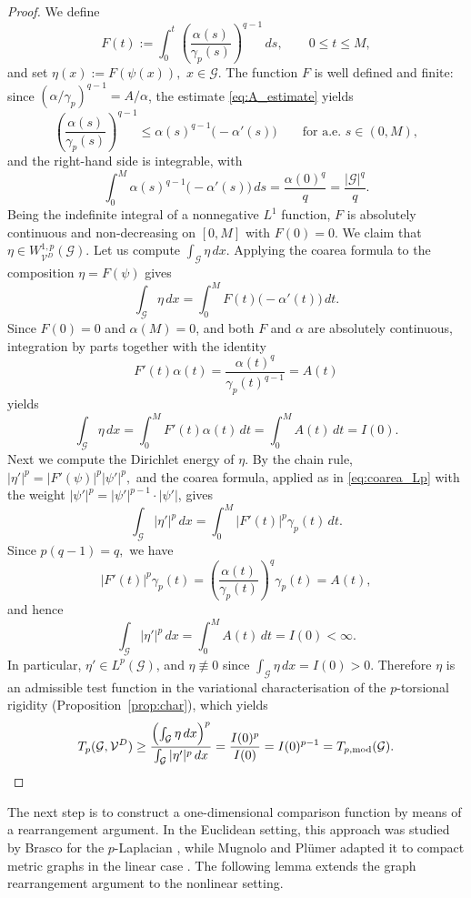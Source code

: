 \documentclass[12pt,a4paper]{article}
\numberwithin{equation}{section}
\newcommand{\WpD}{W^{1,p}_{\mathcal{V}^D}(\mathcal G)}
\begin{document}
\begin{proof}
		
		We define
		\[
		F(t)
		:=
		\int_0^t
		\left(
		\frac{\alpha(s)}{\gamma_p(s)}
		\right)^{q-1}
		\,ds,
		\qquad
		0\le t\le M,
		\]
		and set
		\(
		\eta(x):=F(\psi(x)),
		\) \(x\in\mathcal G.
		\)
		The function $F$ is well defined and finite: since
		$(\alpha/\gamma_p)^{q-1}=A/\alpha$, the estimate \eqref{eq:A_estimate}
		yields
		\[
		\left(\frac{\alpha(s)}{\gamma_p(s)}\right)^{q-1}
		\le
		\alpha(s)^{q-1}\bigl(-\alpha'(s)\bigr)
		\qquad\text{for a.e. }s\in(0,M),
		\]
		and the right-hand side is integrable, with
		\[
		\int_0^M\alpha(s)^{q-1}\bigl(-\alpha'(s)\bigr)\,ds
		=\frac{\alpha(0)^q}{q}
		=\frac{|\mathcal G|^q}{q}.
		\]
		Being the indefinite
		integral of a nonnegative $L^1$ function, $F$ is absolutely continuous
		and non-decreasing on $[0,M]$ with $F(0)=0$.
		We claim that $\eta\in\WpD$.
		Let us compute $\int_{\mathcal G}\eta\,dx$. Applying the coarea
		formula to the composition $\eta=F(\psi)$ gives
		\[
		\int_{\mathcal G}\eta\,dx
		=
		\int_0^M
		F(t)\bigl(-\alpha'(t)\bigr)\,dt.
		\]
		Since $F(0)=0$ and $\alpha(M)=0$, and both $F$ and $\alpha$ are
		absolutely continuous, integration by parts together with the identity
		\[
		F'(t)\alpha(t)
		=
		\frac{\alpha(t)^q}{\gamma_p(t)^{q-1}}
		=
		A(t)
		\]
		yields
		\[
		\int_{\mathcal G}\eta\,dx
		=
		\int_0^M F'(t)\alpha(t)\,dt
		=
		\int_0^M
		A(t)\,dt
		=
		I(0).
		\]
		Next we compute the Dirichlet energy of $\eta$. By the chain rule,
		\(
		|\eta'|^p
		=
		|F'(\psi)|^p|\psi'|^p,
		\)
		and the coarea formula, applied as in \eqref{eq:coarea_Lp} with the
		weight $|\psi'|^p=|\psi'|^{p-1}\cdot|\psi'|$, gives
		\[
		\int_{\mathcal G}|\eta'|^p\,dx
		=
		\int_0^M
		|F'(t)|^p\gamma_p(t)\,dt.
		\]
		Since
		\(
		p(q-1)=q,
		\)
		we have
		\[
		|F'(t)|^p\gamma_p(t)
		=
		\left(
		\frac{\alpha(t)}{\gamma_p(t)}
		\right)^q
		\gamma_p(t)
		=
		A(t),
		\]
		and hence
		\[
		\int_{\mathcal G}|\eta'|^p\,dx
		=
		\int_0^M
		A(t)\,dt
		=
		I(0)
		<\infty.
		\]
		In particular, $\eta'\in L^p(\mathcal G)$, and
		$\eta\not\equiv0$ since $\int_{\mathcal G}\eta\,dx=I(0)>0$. Therefore
		$\eta$ is an admissible test function in the variational
		characterisation of the $p$-torsional rigidity
		(Proposition~\ref{prop:char}), which yields
		\[
		T_p(\mathcal G,\mathcal V^D)
		\ge
		\frac{\left(\int_{\mathcal G}\eta\,dx\right)^p}
		{\int_{\mathcal G}|\eta'|^p\,dx}
		=
		\frac{I(0)^p}{I(0)}
		=
		I(0)^{p-1}
		=
		T_{p,\mathrm{mod}}(\mathcal{G}).\qedhere
		\]
	\end{proof}
	The next step is to construct a one-dimensional comparison function by
	means of a rearrangement argument. In the Euclidean setting, this approach
	was studied by Brasco for the $p$-Laplacian \cite{Brasco}, while
	Mugnolo and Pl\"umer adapted it to compact metric graphs in the linear case
	\cite[Lemma~5.17]{MuPl}. The following lemma extends the graph
	rearrangement argument to the nonlinear setting.
	
\end{document}
